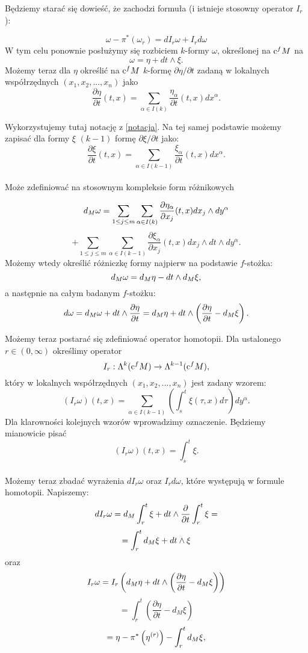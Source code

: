 \documentclass[licencjacka]{pracamgr}
\theoremstyle{definition}
\theoremstyle{definition}
\theoremstyle{plain}
\theoremstyle{plain}
\def\cfm{\ensuremath\mathrm{c}^fM}
\def\M{\ensuremath M}
\begin{document}
Będziemy starać się dowieść, że zachodzi formuła (i istnieje stosowny operator 
$I_r$):

\[
    \omega - \pi^\ast(\omega_r) = dI_r \omega + I_r d\omega
\]
W tym celu ponownie posłużymy się rozbiciem $k$-formy $\omega$, określonej na
$\cfm$ na
\[
    \omega = \eta + dt \wedge \xi.
\] 
Możemy teraz dla $\eta$ określić na $\cfm$ $k$-formę $\partial \eta / \partial
t$ zadaną w lokalnych współrzędnych $(x_1, x_2, ..., x_n)$ jako
\[
    \frac{\partial \eta}{\partial t} (t, x) =
    \sum_{\alpha \in I(k)} \frac{\eta_\alpha}{\partial t}(t, x) dx^\alpha.
\]

Wykorzystujemy tutaj notację z \ref{notacja}. Na tej samej podstawie możemy 
zapisać dla formy $\xi$ $(k-1)$ formę $\partial \xi / \partial t$ jako:
\[
    \frac{\partial \xi}{\partial t} (t, x) =
    \sum_{\alpha \in I(k-1)} \frac{\xi_\alpha}{\partial t}(t, x) dx^\alpha. 
\] \\

Może zdefiniować na stosownym
kompleksie form różnikowych

\[
    d_\M \omega =  
    \sum_{1 \leq j \leq m} \sum_{\alpha \in I(k)}
    \frac{\partial \eta_\alpha}{\partial x_j}(t, x) dx_j \wedge dy^\alpha
\]
\[
    + \sum_{1 \leq j \leq m} \sum_{\alpha \in I(k-1)}
    \frac{\partial \xi_\alpha}{\partial x_j}(t, x) dx_j \wedge dt \wedge dy^\alpha.
\]
Możemy wtedy określić różniczkę formy najpierw na podstawie $f$-stożka:
\[
    d_\M \omega = d_\M \eta - dt \wedge d_\M \xi,
\]
a następnie na całym badanym $f$-stożku:
\[
    d \omega = 
    d_\M \omega + dt \wedge \frac{\partial \eta}{\partial t} = 
    d_\M \eta + dt \wedge \left( 
        \frac{\partial \eta}{\partial t} - d_\M \xi
    \right). \\
\]

Możemy teraz postarać się zdefiniować operator homotopii.
Dla ustalonego $r \in (0, \infty)$ określimy operator
\[
    I_r: \Lambda^k(\cfm) \rightarrow \Lambda^{k-1}(\cfm),
\]
który w lokalnych współrzędnych $(x_1, x_2, ..., x_n)$ jest zadany wzorem:
\[
    (I_r \omega)(t, x) = \sum_{\alpha \in I(k-1)}
      \left(
          \int_s^t \xi(\tau, x) d\tau 
      \right) dy^\alpha.
\] 
Dla klarowności kolejnych wzorów wprowadzimy oznaczenie. Będziemy mianowicie pisać
\[
    (I_r \omega)(t, x) = \int_s^t \xi.
\] \\

Możemy teraz zbadać wyrażenia $d I_r \omega$ oraz $I_r d \omega$, które występują
w formule homotopii. Napiszemy:
\[
    d I_r \omega = d_\M \int_r^t \xi + dt \wedge \frac{\partial}{\partial t} \int_r^t \xi =
\]
\[
    = \int_r^t d_\M \xi + dt \wedge \xi
\]
oraz
\[
    I_r \omega = I_r
    \left(
        d_\M \eta + dt \wedge \left( \frac{\partial \eta}{\partial t} - d_\M \xi \right)
    \right)
\]
\[
    = \int_r^t 
        \left(
            \frac{\partial \eta}{\partial t} - d_M \xi
        \right)
\]
\[
    = \eta - \pi^\ast \left( \eta^{(r)} \right) - \int_r^t d_\M \xi,
\]
\end{document}

